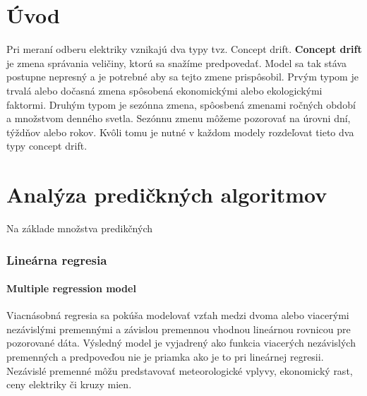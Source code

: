\documentclass[12pt,oneside,slovak,a4paper]{book}
\begin{document}

\chapter*{Úvod}

Pri meraní odberu elektriky vznikajú dva typy tvz. Concept drift.
\textbf{Concept drift} je zmena správania veličiny, ktorú sa snažíme
predpovedať. Model sa tak stáva postupne nepresný a je potrebné aby sa tejto
zmene prispôsobil. Prvým typom je trvalá alebo dočasná zmena spôsobená
ekonomickými alebo ekologickými faktormi. Druhým typom je sezónna zmena,
spôosbená zmenami ročných období a množstvom denného svetla. Sezónnu zmenu
môžeme pozorovať na úrovni dní, týždňov alebo rokov. Kvôli tomu je nutné
v každom modely rozdeľovat tieto dva typy concept drift\cite{Grmanova2016}.


\chapter{Analýza predičkných algoritmov}
Na základe množstva predikčných
\subsection{Lineárna regresia}

\subsubsection{Multiple regression model}
Viacnásobná regresia sa pokúša modelovať vzťah medzi dvoma alebo viacerými
nezávislými premennými a závislou premennou vhodnou lineárnou rovnicou pre
pozorované dáta. Výsledný model je vyjadrený ako funkcia viacerých nezávislých
premenných a predpoveďou nie je priamka ako je to pri lineárnej
regresii\cite{Grmanova2016}.
Nezávislé premenné môžu predstavovať meteorologické vplyvy, ekonomický rast,
ceny elektriky či kruzy mien\cite{KumarSingh2013}.
\end{document}

